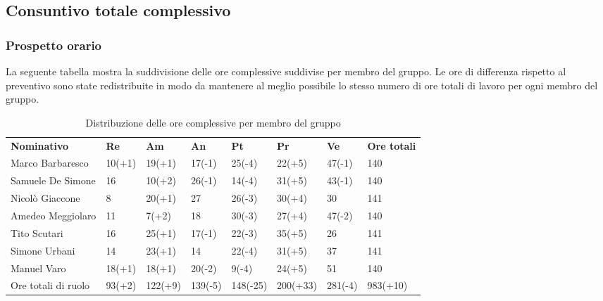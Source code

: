 \pagebreak
\subsection{Consuntivo totale complessivo}
\subsubsection{Prospetto orario}
La seguente tabella mostra la suddivisione delle ore complessive suddivise per membro del gruppo. Le ore di differenza rispetto al preventivo sono state redistribuite in modo da mantenere al meglio possibile lo stesso numero di ore totali di lavoro per ogni membro del gruppo.
\begin{center}
    \begin{table}[ht!]
        \centering
        \caption{Distribuzione delle ore complessive per membro del gruppo}
        \vspace{5px}
        \renewcommand{\arraystretch}{1.8}
        \begin{tabular}{p{100px} p{30px} p{30px} p{35px} p{40px} p{40px} p{35px} p{50px} }
            \rowcolor{logo!70} \textbf{Nominativo} & \textbf{Re} & \textbf{Am} & \textbf{An} & \textbf{Pt} & \textbf{Pr} & \textbf{Ve} & \textbf{Ore totali} \\
            Marco Barbaresco                       & 10(+1)      & 19(+1)      & 17(-1)      & 25(-4)      & 22(+5)      & 47(-1)      & 140                 \\
            Samuele De Simone                      & 16          & 10(+2)      & 26(-1)      & 14(-4)      & 31(+5)      & 43(-1)      & 140                 \\
            Nicolò Giaccone                        & 8           & 20(+1)      & 27          & 26(-3)      & 30(+4)      & 30          & 141                 \\
            Amedeo Meggiolaro                      & 11          & 7(+2)       & 18          & 30(-3)      & 27(+4)      & 47(-2)      & 140                 \\
            Tito Scutari                           & 16          & 25(+1)      & 17(-1)      & 22(-3)      & 35(+5)      & 26          & 141                 \\
            Simone Urbani                          & 14          & 23(+1)      & 14          & 22(-4)      & 31(+5)      & 37          & 141                 \\
            Manuel Varo                            & 18(+1)      & 18(+1)      & 20(-2)      & 9(-4)       & 24(+5)      & 51          & 140                 \\
            Ore totali di ruolo                    & 93(+2)      & 122(+9)     & 139(-5)     & 148(-25)    & 200(+33)    & 281(-4)     & 983(+10)            \\
        \end{tabular}
    \end{table}
\end{center}

